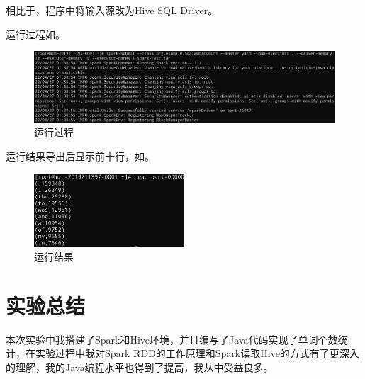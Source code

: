 \documentclass[lang=cn,11pt,a4paper,cite=authornum]{paper}
\begin{document}
相比于，程序中将输入源改为Hive SQL Driver。

运行过程如。

\begin{figure}[!htb]
    \centering
    \includegraphics[width=\textwidth]{./images/res4.jpg}
    \caption{运行过程\label{fig:res4}}
\end{figure}

运行结果导出后显示前十行，如。

\begin{figure}[!htb]
    \centering
    \includegraphics[width=0.5\textwidth]{./images/res5.jpg}
    \caption{运行结果\label{fig:res5}}
\end{figure}

\section{实验总结}

本次实验中我搭建了Spark和Hive环境，并且编写了Java代码实现了单词个数统计，在实验过程中我对Spark RDD的工作原理和Spark读取Hive的方式有了更深入的理解，我的Java编程水平也得到了提高，我从中受益良多。
\end{document}
